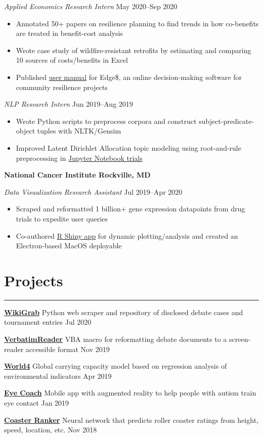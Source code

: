 \documentclass[11pt]{article}
\newcommand{\resumesection}[1]{\vspace{-0.3cm}\section*{\color{highlight}#1}\vspace{-0.3cm}\hrule\vspace{0.3cm}}
\begin{document}
\textit{Applied Economics Research Intern} \hfill May 2020--Sep 2020
\begin{itemize}
	\item Annotated 50+ papers on resilience planning to find trends in how co-benefits are treated in benefit-cost analysis
	\item Wrote case study of wildfire-resistant retrofits by estimating and comparing 10 sources of costs/benefits in Excel
	\item Published \href{https://nvlpubs.nist.gov/nistpubs/SpecialPublications/NIST.SP.1260.pdf}{user manual} for Edge\$, an online decision-making software for community resilience projects
\end{itemize}\par

\textit{NLP Research Intern} \hfill Jun 2019--Aug 2019
\begin{itemize}
	\item Wrote Python scripts to preprocess corpora and construct subject-predicate-object tuples with NLTK/Gensim
	\item Improved Latent Dirichlet Allocation topic modeling using root-and-rule preprocessing in \href{https://github.com/petezh/RR-NLP-Tools}{Jupyter Notebook trials}
\end{itemize}\vspace{0.1cm}

\textbf{National Cancer Institute \hfill Rockville, MD}\par

\textit{Data Visualization Research Assistant} \hfill Jul 2019--Apr 2020 \par
\begin{itemize}
	\item Scraped and reformatted 1 billion+ gene expression datapoints from drug trials to expedite user queries
	\item Co-authored \href{https://github.com/petezh/TP-Workbench}{R Shiny app} for dynamic plotting/analysis and created an Electron-based MacOS deployable
\end{itemize}

\resumesection{Projects}

\textbf{\href{https://github.com/petezh/Disclosure}{WikiGrab}} Python web scraper and repository of disclosed debate cases and tournament entries \hfill Jul 2020 \par
\textbf{\href{https://github.com/petezh/ScreenReader}{VerbatimReader}} VBA macro for reformatting debate documents to a screen-reader accessible format \hfill Nov 2019 \par
\textbf{\href{https://github.com/gautomdas/IMMC-World4/blob/master/US-9365.pdf}{World4}} Global carrying capacity model based on regression analysis of environmental indicators \hfill Apr 2019\par
\textbf{\href{https://github.com/gautomdas/eye-coach}{Eye Coach}} Mobile app with augmented reality to help people with autism train eye contact \hfill Jan 2019 \par
\textbf{\href{https://github.com/prayaggordy/HiMCM}{Coaster Ranker}} Neural network that predicts roller coaster ratings from height, speed, location, etc. \hfill Nov 2018\par
\end{document}
